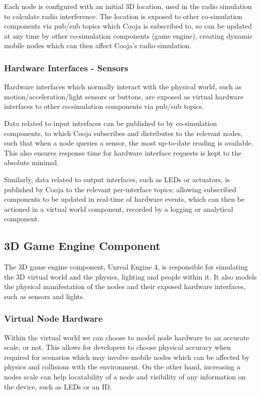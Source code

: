 Each node is configured with an initial 3D location, used in the radio simulation to calculate radio interference. The location is exposed to other co-simulation components via pub/sub topics which Cooja is subscribed to, so can be updated at any time by other co-simulation components (game engine), creating dynamic mobile nodes which can then affect Cooja's radio simulation.

\subsubsection{Hardware Interfaces - Sensors} %
\label{ssub:hardware_interfaces_sensors}

Hardware interfaces which normally interact with the physical world, such as motion/acceleration/light sensors or buttons, are exposed as virtual hardware interfaces to other co-simulation components via pub/sub topics.


Data related to input interfaces can be published to by co-simulation components, to which Cooja subscribes and distributes to the relevant nodes, such that when a node queries a sensor, the most up-to-date reading is available. This also ensures response time for hardware interface requests is kept to the absolute minimal.

Similarly, data related to output interfaces, such as LEDs or actuators, is published by Cooja to the relevant per-interface topics; allowing subscribed components to be updated in real-time of hardware events, which can then be actioned in a virtual world component, recorded by a logging or analytical component.



\subsection{3D Game Engine Component} %
\label{sub:3d_game_engine_component}
The 3D game engine component, Unreal Engine 4, is responsible for simulating the 3D virtual world and the physics, lighting and people within it. It also models the physical manifestation of the nodes and their exposed hardware interfaces, such as sensors and lights.

\subsubsection{Virtual Node Hardware} %
\label{ssub:virtual_node_hardware}
Within the virtual world we can choose to model node hardware to an accurate scale, or not. This allows for developers to choose physical accuracy when required for scenarios which may involve mobile nodes which can be affected by physics and collisions with the environment. On the other hand, increasing a nodes scale can help locatability of a node and visibility of any information on the device, such as LEDs or an ID.


